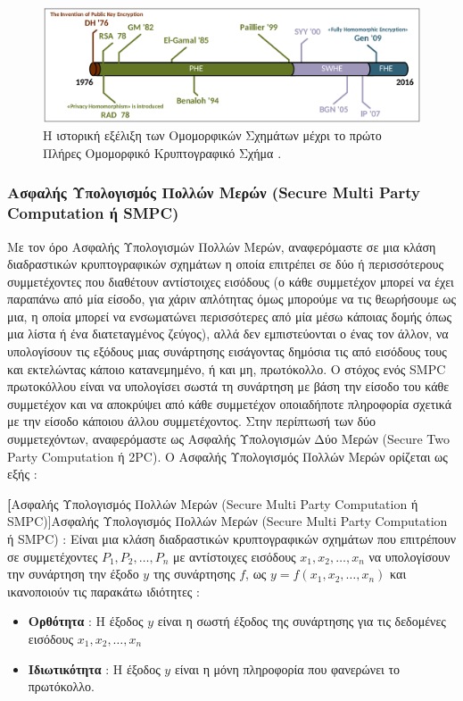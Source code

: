 \begin{figure}
    \centering
    \includegraphics[width=0.8\columnwidth]{./01_body/images/he_timeline.png}
    \caption{Η ιστορική εξέλιξη των Ομομορφικών Σχημάτων μέχρι το πρώτο Πλήρες Ομομορφικό Κρυπτογραφικό Σχήμα \cite{acar2018survey}.}
    \label{fig:he_timeline}
\end{figure}

\subsubsection[Ασφαλής Υπολογισμός Πολλών Μερών (Secure Multi Party Computation ή SMPC)]{Ασφαλής Υπολογισμός Πολλών Μερών (Secure Multi Party \\ Computation ή SMPC)}
Με τον όρο Ασφαλής Υπολογισμών Πολλών Μερών, αναφερόμαστε σε μια κλάση διαδραστικών κρυπτογραφικών σχημάτων η οποία επιτρέπει σε δύο ή περισσότερους συμμετέχοντες που διαθέτουν αντίστοιχες εισόδους (ο κάθε συμμετέχον μπορεί να έχει παραπάνω από μία είσοδο, για χάριν απλότητας όμως μπορούμε να τις θεωρήσουμε ως μια, η οποία μπορεί να ενσωματώνει περισσότερες από μία μέσω κάποιας δομής όπως μια λίστα ή ένα διατεταγμένος ζεύγος), αλλά δεν εμπιστεύονται ο ένας τον άλλον, να υπολογίσουν τις εξόδους μιας συνάρτησης εισάγοντας δημόσια τις από εισόδους τους και εκτελώντας κάποιο κατανεμημένο, ή και μη, πρωτόκολλο. Ο στόχος ενός SMPC πρωτοκόλλου είναι να υπολογίσει σωστά τη συνάρτηση με βάση την είσοδο του κάθε συμμετέχον και να αποκρύψει από κάθε συμμετέχον οποιαδήποτε πληροφορία σχετικά με την είσοδο κάποιου άλλου συμμετέχοντος. Στην περίπτωσή των δύο συμμετεχόντων, αναφερόμαστε ως Ασφαλής Υπολογισμών Δύο Μερών (Secure Two Party Computation ή 2PC). Ο Ασφαλής Υπολογισμός Πολλών Μερών ορίζεται ως εξής :

\begin{definition}
\textbf[Ασφαλής Υπολογισμός Πολλών Μερών (Secure Multi Party Computation ή SMPC)]{Ασφαλής Υπολογισμός Πολλών Μερών (Secure Multi Party Computation ή SMPC)} : Είναι μια κλάση διαδραστικών κρυπτογραφικών σχημάτων που επιτρέπουν σε συμμετέχοντες $P_1, P_2, \dots, P_n$ με αντίστοιχες εισόδους $x_1, x_2, \dots, x_n$ να υπολογίσουν την συνάρτηση την έξοδο $y$ της συνάρτησης $f$, ως $y = f(x_1, x_2, \dots, x_n)$ και ικανοποιούν τις παρακάτω ιδιότητες :

\begin{itemize}
    \item \textbf{Ορθότητα} : Η έξοδος $y$ είναι η σωστή έξοδος της συνάρτησης για τις δεδομένες εισόδους $x_1, x_2, \dots, x_n$
    \item \textbf{Ιδιωτικότητα} : Η έξοδος $y$ είναι η μόνη πληροφορία που φανερώνει το πρωτόκολλο.
\end{itemize}
\end{definition}

